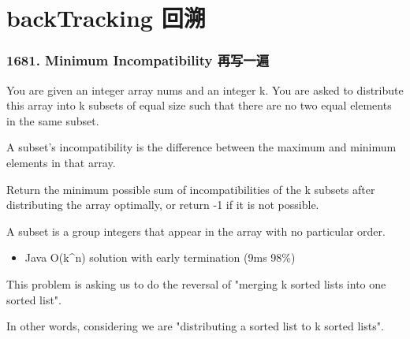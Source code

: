 \documentclass[9pt, b5paaper]{book}
\begin{document}
\chapter{backTracking 回溯}
\label{sec-8}
\subsection{1681. Minimum Incompatibility 再写一遍}
\label{sec-8-0-1}
You are given an integer array nums​​​ and an integer k. You are asked to distribute this array into k subsets of equal size such that there are no two equal elements in the same subset.

A subset's incompatibility is the difference between the maximum and minimum elements in that array.

Return the minimum possible sum of incompatibilities of the k subsets after distributing the array optimally, or return -1 if it is not possible.

A subset is a group integers that appear in the array with no particular order.
\begin{itemize}
\item Java O(k\^{}n) solution with early termination (9ms 98\%)
\end{itemize}

This problem is asking us to do the reversal of "merging k sorted lists into one sorted list".

In other words, considering we are "distributing a sorted list to k sorted lists".
\end{document}

